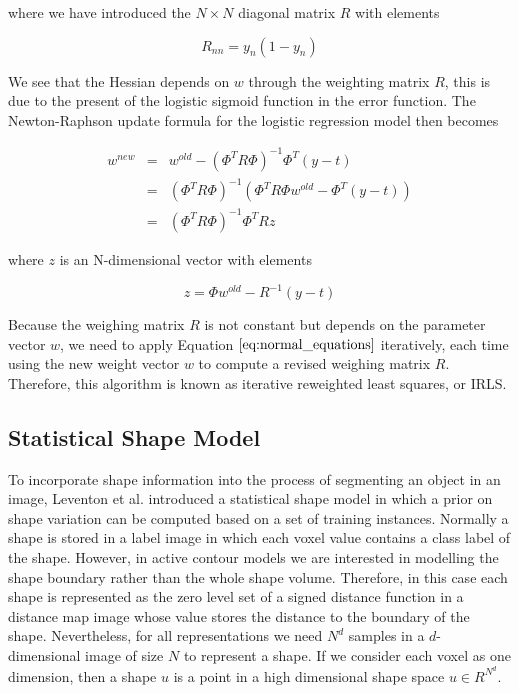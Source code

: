 \documentclass{SMBV12}
\begin{document}
where we have introduced the $N \times N$ diagonal matrix $R$ with elements

\begin{equation}
R_{nn} = y_n(1 - y_n)
\end{equation}

We see that the Hessian depends on $w$ through the weighting matrix $R$, this is due to the present of the logistic sigmoid function in the error function. The Newton-Raphson update formula for the logistic regression model then becomes

\begin{equation}
\begin{array}{lcl}
w^{new} & = & w^{old} - (\Phi^T R \Phi)^{-1}\Phi^T(y - t)\\
		& = & (\Phi^T R \Phi)^{-1}(\Phi^T R \Phi w^{old} - \Phi^T(y - t))\\
		& = & (\Phi^T R \Phi)^{-1}\Phi^T R z
\end{array}
\label{eq:normal_equations}
\end{equation}

where $z$ is an N-dimensional vector with elements

\begin{equation}
z = \Phi w^{old} - R^{-1}(y - t)
\end{equation}

Because the weighing matrix $R$ is not constant but depends on the parameter vector $w$, we need to apply Equation $\ref{eq:normal_equations}$ iteratively, each time using the new weight vector $w$ to compute a revised weighing matrix $R$. Therefore, this algorithm is known as iterative reweighted least squares, or IRLS.

\subsection{Statistical Shape Model}

To incorporate shape information into the process of segmenting an object in an image, Leventon et al. \cite{leventon2000statistical} introduced a statistical shape model in which a prior on shape variation can be computed based on a set of training instances. Normally a shape is stored in a label image in which each voxel value contains a class label of the shape. However, in active contour models we are interested in modelling the shape boundary rather than the whole shape volume. Therefore, in this case each shape is represented as the zero level set of a signed distance function in a distance map image whose value stores the distance to the boundary of the shape. Nevertheless, for all representations we need $N^d$ samples in a $d$-dimensional image of size $N$ to represent a shape. If we consider each voxel as one dimension, then a shape $u$ is a point in a high dimensional shape space $u \in R^{N^d}$.
\end{document}
